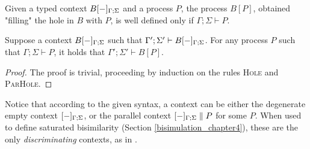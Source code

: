 Given a typed context $B[{-}]_{\Gamma; \Sigma}$ and a process $P$, the process $B[P]$, obtained "filling" the hole in $B$ with $P$, is well defined only if $\Gamma;\Sigma \vdash P$.

\begin{theorem}
	Suppose a context $B[{-}]_{\Gamma; \Sigma}$ such that $\Gamma'; \Sigma' \vdash B[{-}]_{\Gamma; \Sigma}$. For any process $P$ such that $\Gamma; \Sigma \vdash P$, it holds that $\Gamma'; \Sigma' \vdash B[P]$.
\end{theorem}
\begin{proof}
	The proof is trivial, proceeding by induction on the rules {\footnotesize\scshape Hole} and {\footnotesize\scshape ParHole}.
\end{proof}

Notice that according to the given syntax, a context can be either the degenerate empty context $[{-}]_{\Gamma;\Sigma}$, or the parallel context $[{-}]_{\Gamma;\Sigma} \parallel P$ for some $P$. When used to define saturated bisimilarity (Section \ref{bisimulation_chapter4}), these are the only \textit{discriminating} contexts, as in \cite{bonchiGeneralTheoryBarbs2014}.